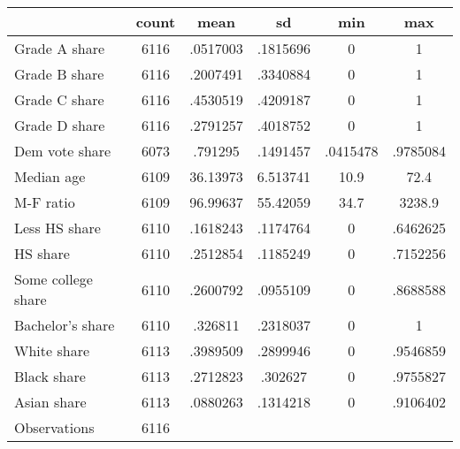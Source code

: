 {
\def\sym#1{\ifmmode^{#1}\else\(^{#1}\)\fi}
\begin{tabular}{l*{1}{ccccc}}
\toprule
                    &       count&        mean&          sd&         min&         max\\
\midrule
Grade A share       &        6116&    .0517003&    .1815696&           0&           1\\
Grade B share       &        6116&    .2007491&    .3340884&           0&           1\\
Grade C share       &        6116&    .4530519&    .4209187&           0&           1\\
Grade D share       &        6116&    .2791257&    .4018752&           0&           1\\
Dem vote share      &        6073&     .791295&    .1491457&    .0415478&    .9785084\\
Median age          &        6109&    36.13973&    6.513741&        10.9&        72.4\\
M-F ratio           &        6109&    96.99637&    55.42059&        34.7&      3238.9\\
Less HS share       &        6110&    .1618243&    .1174764&           0&    .6462625\\
HS share            &        6110&    .2512854&    .1185249&           0&    .7152256\\
Some college share  &        6110&    .2600792&    .0955109&           0&    .8688588\\
Bachelor's share    &        6110&     .326811&    .2318037&           0&           1\\
White share         &        6113&    .3989509&    .2899946&           0&    .9546859\\
Black share         &        6113&    .2712823&     .302627&           0&    .9755827\\
Asian share         &        6113&    .0880263&    .1314218&           0&    .9106402\\
\midrule
Observations        &        6116&            &            &            &            \\
\bottomrule
\end{tabular}
}
